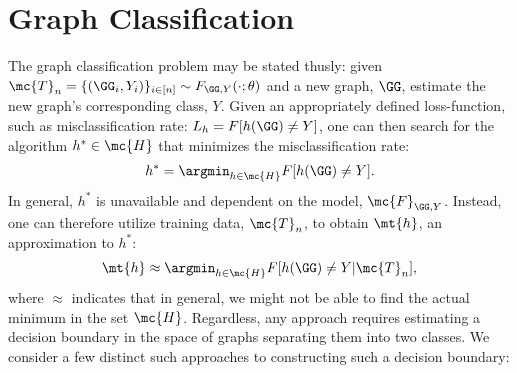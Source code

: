 \section{Graph Classification} %
\label{sec:graph_classification}


The graph classification problem may be stated thusly: given $\mc{T}_n=\{(\GG_i,Y_i)\}_{i \in [n]} \sim F_{\GG,Y}(\cdot; \theta)$ and a new graph, $\GG$, estimate the new graph's corresponding class, $Y$.  Given an appropriately defined loss-function, such as misclassification rate: $L_h=F[h(\GG) \neq Y]$, one can then search for the algorithm $h^* \in \mc{H}$ that minimizes the misclassification rate:
\begin{align}
	h^* = \argmin_{h \in \mc{H}} F[h(\GG) \neq Y].
\end{align}
In general, $h^*$ is unavailable and dependent on the model, $\mc{F}_{\GG,Y}$.  Instead, one can therefore utilize training data, $\mc{T}_n$, to obtain $\mt{h}$, an approximation to $h^*$:
\begin{align}
	\mt{h} \approx \argmin_{h \in \mc{H}} F[h(\GG) \neq Y | \mc{T}_n],
\end{align}
where $\approx$ indicates that in general, we might not be able to find the actual minimum in the set $\mc{H}$. Regardless, any approach requires estimating a decision boundary in the space of graphs separating them into two classes.  We consider a few distinct such approaches to constructing such a decision boundary:


